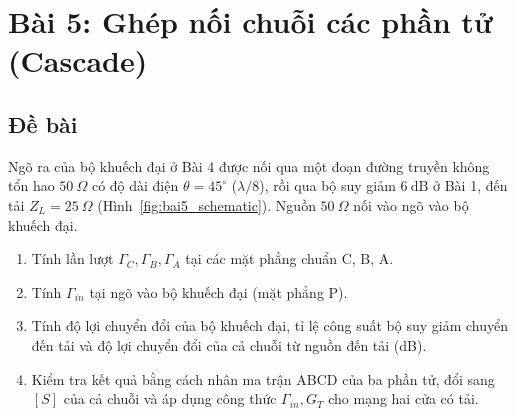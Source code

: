 \documentclass[12pt,a4paper]{article}
\begin{document}
\newpage

\section{Bài 5: Ghép nối chuỗi các phần tử (Cascade)}

\subsection{Đề bài}
Ngõ ra của bộ khuếch đại ở Bài 4 được nối qua một đoạn đường truyền không tổn hao $50~\Omega$ có độ dài điện $\theta = 45^\circ$ ($\lambda/8$), rồi qua bộ suy giảm $6~\text{dB}$ ở Bài 1, đến tải $Z_L = 25~\Omega$ (Hình~\ref{fig:bai5_schematic}). Nguồn $50~\Omega$ nối vào ngõ vào bộ khuếch đại.
\begin{enumerate}
    \item[(a)] Tính lần lượt $\Gamma_C, \Gamma_B, \Gamma_A$ tại các mặt phẳng chuẩn C, B, A.
    \item[(b)] Tính $\Gamma_{in}$ tại ngõ vào bộ khuếch đại (mặt phẳng P).
    \item[(c)] Tính độ lợi chuyển đổi của bộ khuếch đại, tỉ lệ công suất bộ suy giảm chuyển đến tải và độ lợi chuyển đổi của cả chuỗi từ nguồn đến tải (dB).
    \item[(d)] Kiểm tra kết quả bằng cách nhân ma trận ABCD của ba phần tử, đổi sang $[S]$ của cả chuỗi và áp dụng công thức $\Gamma_{in}, G_T$ cho mạng hai cửa có tải.
\end{enumerate}
\end{document}
